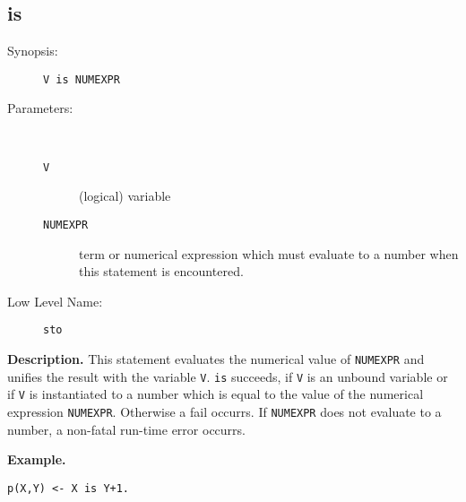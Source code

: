 %
%
%
\subsection{is}

\begin{description}
\item[Synopsis:]
	{\tt V is NUMEXPR}
\item[Parameters:]\ \\[-0.5cm]
	\begin{description}
	\item[{\tt V}] (logical) variable
	\item[{\tt NUMEXPR}]
term or numerical expression which must evaluate to a number
        when this statement is encountered.
	\end{description}
\item[Low Level Name:]
	{\tt sto}
\end{description}

\vspace*{0.5cm}
\noindent
{\bf Description.}
This statement evaluates the numerical value of {\tt NUMEXPR} and
unifies the result with the variable {\tt V}. {\tt is} succeeds, 
if {\tt V} is an unbound variable or
if {\tt V} is instantiated to a number which is equal to the value
of the numerical expression {\tt NUMEXPR}.
Otherwise a fail occurrs.
If {\tt NUMEXPR} does not evaluate to a number, a non-fatal run-time
error occurrs.

\vspace*{0.5cm}
\noindent
{\bf Example.}
\begin{verbatim}
p(X,Y) <- X is Y+1.
\end{verbatim}


